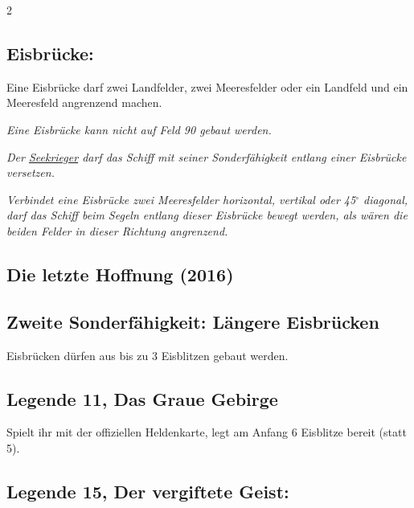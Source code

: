 \documentclass[10pt, a4paper, oneside]{book}
\newcommand{\fan}[1]{\textit{#1}}
\begin{document}
\begin{multicols*}{2}
\begin{bgcolor}
\subsection{Eisbrücke:}

Eine Eisbrücke darf zwei Landfelder, zwei Meeresfelder oder ein Landfeld und ein Meeresfeld angrenzend machen.
\supercite{mh-begleitheft}

\fan{Eine Eisbrücke kann nicht auf Feld 90 gebaut werden.}


\fan{Der \hyperref[seekrieger]{Seekrieger} darf das Schiff mit seiner Sonderfähigkeit entlang einer Eisbrücke versetzen.}

\fan{Verbindet eine Eisbrücke zwei Meeresfelder horizontal, vertikal oder 45$^\circ$ diagonal, darf das Schiff beim Segeln entlang dieser Eisbrücke bewegt werden, als wären die beiden Felder in dieser Richtung angrenzend.}



\end{bgcolor}





\begin{bgcolor}
\section{Die letzte Hoffnung (2016)}



\subsection{Zweite Sonderfähigkeit: Längere Eisbrücken}

Eisbrücken dürfen aus bis zu 3 Eisblitzen gebaut werden.
\supercite{mh11-heldenkarte-eis-daemon}




\subsection{Legende 11, Das Graue Gebirge}

Spielt ihr mit der offiziellen Heldenkarte, legt am Anfang 6 Eisblitze bereit (statt 5).



\subsection{Legende 15, Der vergiftete Geist:}


\end{bgcolor}
\end{multicols*}
\end{document}
